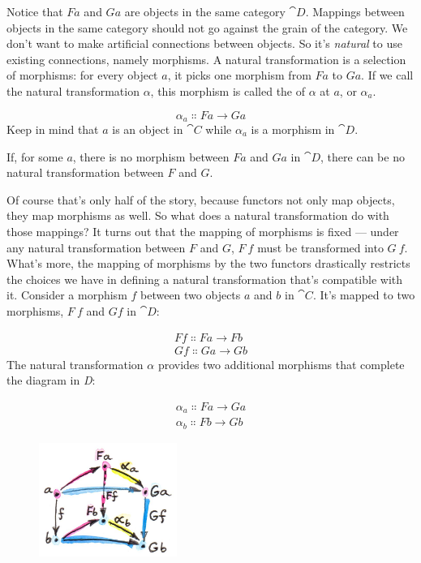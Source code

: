 \noindent
Notice that $F a$ and $G a$ are objects in the same
category $\cat{D}$. Mappings between objects in the same category should
not go against the grain of the category. We don't want to make
artificial connections between objects. So it's \emph{natural} to use
existing connections, namely morphisms. A natural transformation is a
selection of morphisms: for every object $a$, it picks one
morphism from $F a$ to $G a$. If we call the natural
transformation $\alpha$, this morphism is called the 
of $\alpha$ at $a$, or $\alpha_a$.

\[\alpha_a \Colon F a \to G a\]
Keep in mind that $a$ is an object in $\cat{C}$ while $\alpha_a$
is a morphism in $\cat{D}$.

If, for some $a$, there is no morphism between $F a$ and
$G a$ in $\cat{D}$, there can be no natural transformation
between $F$ and $G$.

Of course that's only half of the story, because functors not only map
objects, they map morphisms as well. So what does a natural
transformation do with those mappings? It turns out that the mapping of
morphisms is fixed --- under any natural transformation between $F$ and $G$,
$F\ f$ must be transformed into $G\ f$. What's more, the
mapping of morphisms by the two functors drastically restricts the
choices we have in defining a natural transformation that's compatible
with it. Consider a morphism $f$ between two objects $a$
and $b$ in $\cat{C}$. It's mapped to two morphisms, $F\ f$
and $G f$ in $\cat{D}$:

\begin{gather*}
F f \Colon F a \to F b \\
G f \Colon G a \to G b
\end{gather*}
The natural transformation $\alpha$ provides two additional morphisms
that complete the diagram in \emph{D}:

\begin{gather*}
\alpha_a \Colon F a \to G a \\
\alpha_b \Colon F b \to G b
\end{gather*}

\begin{figure}[H]
\centering
\includegraphics[width=0.4\textwidth]{images/3_naturality.jpg}
\end{figure}

